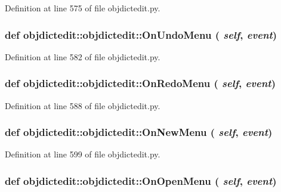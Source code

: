 Definition at line 575 of file objdictedit.py.\hypertarget{classobjdictedit_1_1objdictedit_264a8c0092529d669e103a0e08bfa759}{
\subsubsection[OnUndoMenu]{\setlength{\rightskip}{0pt plus 5cm}def objdictedit::objdictedit::On\-Undo\-Menu ( {\em self},  {\em event})}}
\label{classobjdictedit_1_1objdictedit_264a8c0092529d669e103a0e08bfa759}




Definition at line 582 of file objdictedit.py.\hypertarget{classobjdictedit_1_1objdictedit_e864e63ae5efdb88512d02c0e51d895e}{
\subsubsection[OnRedoMenu]{\setlength{\rightskip}{0pt plus 5cm}def objdictedit::objdictedit::On\-Redo\-Menu ( {\em self},  {\em event})}}
\label{classobjdictedit_1_1objdictedit_e864e63ae5efdb88512d02c0e51d895e}




Definition at line 588 of file objdictedit.py.\hypertarget{classobjdictedit_1_1objdictedit_40237739c2edecc9ba933051404a5c61}{
\subsubsection[OnNewMenu]{\setlength{\rightskip}{0pt plus 5cm}def objdictedit::objdictedit::On\-New\-Menu ( {\em self},  {\em event})}}
\label{classobjdictedit_1_1objdictedit_40237739c2edecc9ba933051404a5c61}




Definition at line 599 of file objdictedit.py.\hypertarget{classobjdictedit_1_1objdictedit_98335ef3e9581fd3915a23d40b7f66c0}{
\subsubsection[OnOpenMenu]{\setlength{\rightskip}{0pt plus 5cm}def objdictedit::objdictedit::On\-Open\-Menu ( {\em self},  {\em event})}}
\label{classobjdictedit_1_1objdictedit_98335ef3e9581fd3915a23d40b7f66c0}




